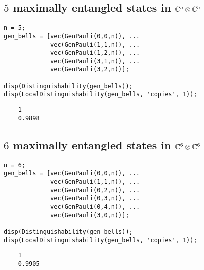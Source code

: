 \subsection*{$5$ maximally entangled states in $\mathbb{C}^{5}\otimes\mathbb{C}^{5}$}
\begin{verbatim}
n = 5;
gen_bells = [vec(GenPauli(0,0,n)), ...
             vec(GenPauli(1,1,n)), ...
             vec(GenPauli(1,2,n)), ...
             vec(GenPauli(3,1,n)), ...
             vec(GenPauli(3,2,n))];

disp(Distinguishability(gen_bells));
disp(LocalDistinguishability(gen_bells, 'copies', 1));
\end{verbatim}
\color{lightgray} 
\begin{verbatim}     
    1
    0.9898
\end{verbatim} \color{black}

\subsection*{$6$ maximally entangled states in $\mathbb{C}^{6}\otimes\mathbb{C}^{6}$}
\begin{verbatim}
n = 6;
gen_bells = [vec(GenPauli(0,0,n)), ...
             vec(GenPauli(1,1,n)), ...
             vec(GenPauli(0,2,n)), ...
             vec(GenPauli(0,3,n)), ...
             vec(GenPauli(0,4,n)), ...
             vec(GenPauli(3,0,n))];

disp(Distinguishability(gen_bells));
disp(LocalDistinguishability(gen_bells, 'copies', 1));
\end{verbatim}
\color{lightgray} 
\begin{verbatim}     
    1
    0.9905
\end{verbatim} \color{black}

